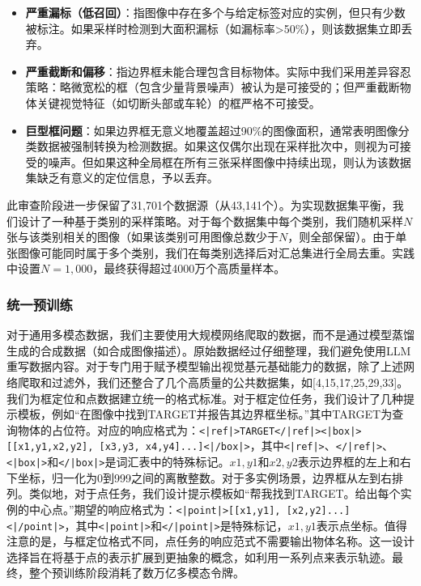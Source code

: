 \documentclass[11pt,a4paper]{article}
\begin{document}
\begin{itemize}
    \item \textbf{严重漏标（低召回）}：指图像中存在多个与给定标签对应的实例，但只有少数被标注。如果采样时检测到大面积漏标（如漏标率>50\%），则该数据集立即丢弃。
    \item \textbf{严重截断和偏移}：指边界框未能合理包含目标物体。实际中我们采用差异容忍策略：略微宽松的框（包含少量背景噪声）被认为是可接受的；但严重截断物体关键视觉特征（如切断头部或车轮）的框严格不可接受。
    \item \textbf{巨型框问题}：如果边界框无意义地覆盖超过90\%的图像面积，通常表明图像分类数据被强制转换为检测数据。如果这仅偶尔出现在采样批次中，则视为可接受的噪声。但如果这种全局框在所有三张采样图像中持续出现，则认为该数据集缺乏有意义的定位信息，予以丢弃。
\end{itemize}

此审查阶段进一步保留了31,701个数据源（从43,141个）。为实现数据集平衡，我们设计了一种基于类别的采样策略。对于每个数据集中每个类别，我们随机采样$N$张与该类别相关的图像（如果该类别可用图像总数少于$N$，则全部保留）。由于单张图像可能同时属于多个类别，我们在每类别选择后对汇总集进行全局去重。实践中设置$N=1,000$，最终获得超过4000万个高质量样本。

\subsubsection{统一预训练}

对于通用多模态数据，我们主要使用大规模网络爬取的数据，而不是通过模型蒸馏生成的合成数据（如合成图像描述）。原始数据经过仔细整理，我们避免使用LLM重写数据内容。对于专门用于赋予模型输出视觉基元基础能力的数据，除了上述网络爬取和过滤外，我们还整合了几个高质量的公共数据集，如[4,15,17,25,29,33]。我们为框定位和点数据建立统一的格式标准。对于框定位任务，我们设计了几种提示模板，例如“在图像中找到TARGET并报告其边界框坐标。”其中TARGET为查询物体的占位符。对应的响应格式为：\texttt{<|ref|>TARGET</|ref|><|box|>[[x1,y1,x2,y2], [x3,y3, x4,y4]...]<|/box|>}，其中\texttt{<|ref|>}、\texttt{</|ref|>}、\texttt{<|box|>}和\texttt{</|box|>}是词汇表中的特殊标记。$x1,y1$和$x2,y2$表示边界框的左上和右下坐标，归一化为0到999之间的离散整数。对于多实例场景，边界框从左到右排列。类似地，对于点任务，我们设计提示模板如“帮我找到TARGET。给出每个实例的中心点。”期望的响应格式为：\texttt{<|point|>[[x1,y1], [x2,y2]...]<|/point|>}，其中\texttt{<|point|>}和\texttt{</|point|>}是特殊标记，$x1,y1$表示点坐标。值得注意的是，与框定位格式不同，点任务的响应范式不需要输出物体名称。这一设计选择旨在将基于点的表示扩展到更抽象的概念，如利用一系列点来表示轨迹。最终，整个预训练阶段消耗了数万亿多模态令牌。
\end{document}
